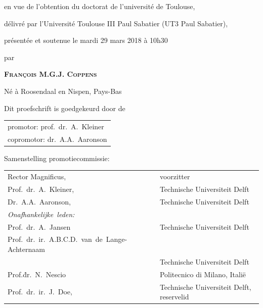 \begin{titlepage}
\begin{center}
\bigskip
\bigskip

en vue de l'obtention du doctorat de l'université de Toulouse,

délivré par l'Université Toulouse III Paul Sabatier (UT3 Paul Sabatier),

présentée et soutenue le mardi 29 mars 2018 à 10h30

\bigskip
\bigskip

par

\bigskip
\bigskip

\makeatletter
{\Large\bfseries\textsc{François M.G.J. Coppens}}
\makeatother

\bigskip
\bigskip

Né à Roosendaal en Nispen, Pays-Bas

\vspace*{2\bigskipamount}

\end{center}

\clearpage
\thispagestyle{empty}

\noindent Dit proefschrift is goedgekeurd door de

\medskip\noindent
\begin{tabular}{l}
    promotor: prof.\ dr.\ A.\ Kleiner \\
    copromotor: dr.\ A.A.\ Aaronson
\end{tabular}

\bigskip
\noindent Samenstelling promotiecommissie:

\medskip\noindent
\begin{tabular}{p{3cm}l}
    Rector Magnificus, & voorzitter \\
    Prof.\ dr.\ A.\ Kleiner, & Technische Universiteit Delft \\
    Dr.\ A.A.\ Aaronson, & Technische Universiteit Delft \\

    \medskip
    \mbox{\emph{Onafhankelijke leden:}} & \\

    Prof.\ dr.\ A.\ Jansen & Technische Universiteit Delft \\
    \mbox{Prof.\ dr.\ ir.\ A.B.C.D.\ van de Lange-Achternaam} & \\
      & Technische Universiteit Delft \\
    Prof.\.dr.\ N.\ Nescio & Politecnico di Milano, Itali\"e \\
    Prof.\ dr.\ ir.\ J.\ Doe, & Technische Universiteit Delft, reservelid \\


\end{tabular}
\end{titlepage}
